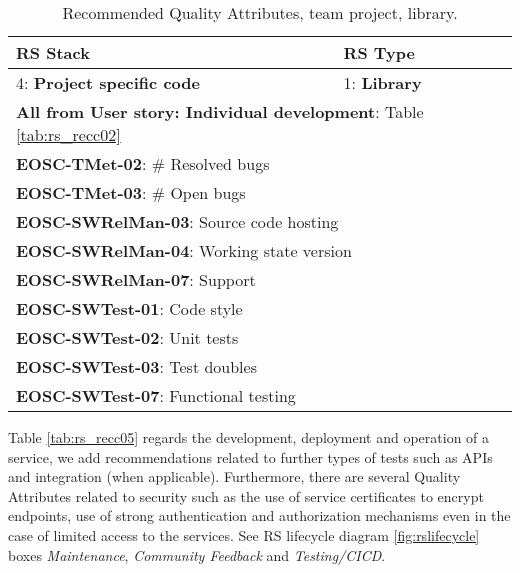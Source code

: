 \begin{center}
\begin{table}[h]
  \small
  \begin{tabular}{|p{0.65\linewidth}|p{0.35\linewidth}|} \hline

    \textbf{RS Stack} & \textbf{RS Type} \\ \hline \hline
    4: \textbf{Project specific code} &
    1: \textbf{Library} \\ \hline \hline
    \multicolumn{2}{|l|}{\textbf{All from User story: Individual development}: Table \ref{tab:rs_recc02}} \\ \hline
    \multicolumn{2}{|l|}{\textbf{EOSC-TMet-02}: \# Resolved bugs} \\ \hline
    \multicolumn{2}{|l|}{\textbf{EOSC-TMet-03}: \# Open bugs} \\ \hline
    \multicolumn{2}{|l|}{\textbf{EOSC-SWRelMan-03}: Source code hosting} \\ \hline
    \multicolumn{2}{|l|}{\textbf{EOSC-SWRelMan-04}: Working state version} \\ \hline
    \multicolumn{2}{|l|}{\textbf{EOSC-SWRelMan-07}: Support} \\ \hline
    \multicolumn{2}{|l|}{\textbf{EOSC-SWTest-01}: Code style} \\ \hline
    \multicolumn{2}{|l|}{\textbf{EOSC-SWTest-02}: Unit tests} \\ \hline
    \multicolumn{2}{|l|}{\textbf{EOSC-SWTest-03}: Test doubles} \\ \hline
    \multicolumn{2}{|l|}{\textbf{EOSC-SWTest-07}: Functional testing} \\ \hline

  \end{tabular}
  \caption{Recommended Quality Attributes, team project, library.}
  \label{tab:rs_recc04}
\end{table}
\end{center}

Table \ref{tab:rs_recc05} regards the development, deployment and operation of a service, we add recommendations related to further types of tests such as APIs and integration (when applicable). Furthermore, there are several Quality Attributes related to security such as the use of service certificates to encrypt endpoints, use of strong authentication and authorization mechanisms even in the case of limited access to the services. See RS lifecycle diagram \ref{fig:rslifecycle} boxes \textit{Maintenance}, \textit{Community Feedback} and \textit{Testing/CICD}.

